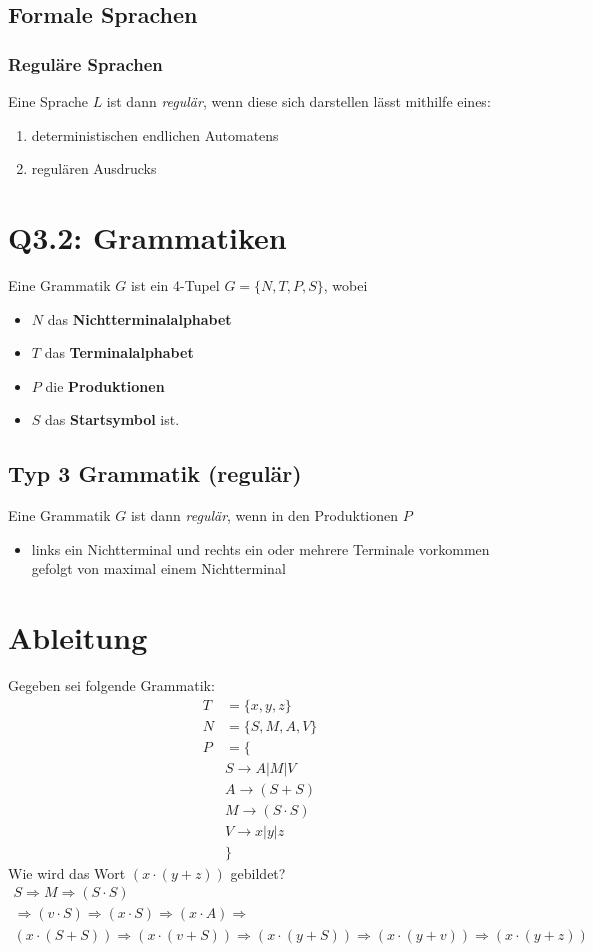 \subsection{Formale Sprachen}
\subsubsection{Reguläre Sprachen}
Eine Sprache $L$ ist dann \textit{regulär}, wenn diese sich darstellen lässt mithilfe eines:
\begin{enumerate}
    \item deterministischen endlichen Automatens
    \item regulären Ausdrucks
\end{enumerate}

\section{Q3.2: Grammatiken}
Eine Grammatik $G$ ist ein 4-Tupel $G=\{N,T,P,S\}$, wobei
\begin{itemize}
    \item $N$ das \textbf{Nichtterminalalphabet}
    \item $T$ das \textbf{Terminalalphabet}
    \item $P$ die \textbf{Produktionen}
    \item $S$ das \textbf{Startsymbol} ist.
\end{itemize}
\subsection{Typ 3 Grammatik (regulär)}
Eine Grammatik $G$ ist dann \textit{regulär}, wenn in den Produktionen $P$
\begin{itemize}
    \item links ein Nichtterminal und rechts ein oder mehrere Terminale vorkommen gefolgt von maximal einem Nichtterminal
\end{itemize}
\section{Ableitung}
Gegeben sei folgende Grammatik:
\begin{align*}
    T &= \{x,y,z\}\\
    N &= \{S, M, A, V\}\\
    P &= \{\\
        &S\rightarrow A|M|V\\
        &A\rightarrow (S+S)\\
        &M\rightarrow (S\cdot S)\\
        &V\rightarrow x|y|z\\
    &\}
\end{align*}
Wie wird das Wort $(x\cdot (y+z))$ gebildet?
\begin{align*}
    S\Rightarrow M\Rightarrow (S\cdot S)\\
    \Rightarrow (v\cdot S)\Rightarrow (x\cdot S)\Rightarrow (x\cdot A)\Rightarrow\\ (x\cdot (S+S))\Rightarrow (x\cdot (v + S))\Rightarrow (x\cdot (y + S))\Rightarrow (x\cdot (y + v))\Rightarrow (x\cdot (y + z))
\end{align*}
